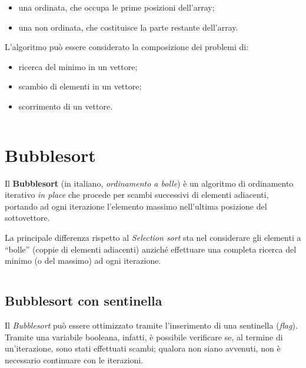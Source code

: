   \begin{itemize}
    \item una ordinata, che occupa le prime posizioni dell'array;
    \item una non ordinata, che costituisce la parte restante dell'array.
  \end{itemize}

  \noindent{} L'algoritmo può essere considerato la composizione dei problemi di:

  \begin{itemize}
    \item ricerca del minimo in un vettore;
    \item scambio di elementi in un vettore;
    \item scorrimento di un vettore.
  \end{itemize}

  \inputminted{cpp}{./src/selection.cpp}

  \section{Bubblesort}\label{sec:bubble}

  Il \textbf{Bubblesort} (in italiano, \textit{ordinamento a bolle})
  è un algoritmo di ordinamento iterativo \textit{in place} che procede per scambi successivi di elementi adiacenti,
  portando ad ogni iterazione l’elemento massimo nell'ultima posizione del sottovettore.

  La principale differenza rispetto al \textit{Selection sort} sta nel considerare gli elementi a ``bolle''
  (coppie di elementi adiacenti) anziché effettuare una completa ricerca del minimo (o del massimo) ad ogni iterazione.

  \inputminted{cpp}{./src/bubble/simple.cpp}

  \clearpage

  \subsection{Bubblesort con sentinella}\label{subsec:bubble:flag}

  Il \textit{Bubblesort} può essere ottimizzato tramite l'inserimento di una sentinella (\textit{flag}).
  Tramite una variabile booleana, infatti, è possibile verificare se, al termine di un'iterazione,
  sono stati effettuati scambi; qualora non siano avvenuti, non è necessario continuare con le iterazioni.

  \inputminted{cpp}{./src/bubble/flag.cpp}

